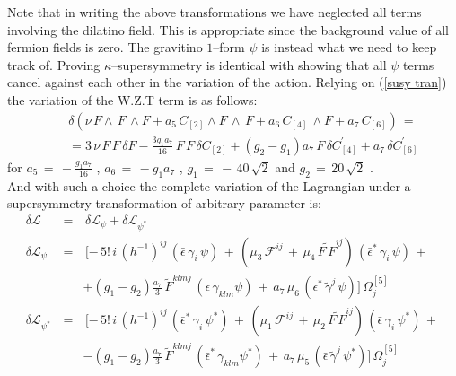 \documentclass[a4paper,11pt]{article}
\def\tilde{\widetilde}
\begin{document}
Note that in writing the above transformations we have neglected all
terms involving the dilatino field. This is appropriate since the
background value of all fermion fields is zero. The gravitino
$1$--form $\psi$ is instead what we need to keep track of. Proving
$\kappa$--supersymmetry is identical with showing that all $\psi$
terms cancel against each other in the variation of the action.
Relying on (\ref{susy tran}) the variation of the W.Z.T term is as follows:
\begin{eqnarray}
&&\delta ( \nu \, F \wedge \, F \, \wedge F +a_5 \, C_{[2]} \wedge F \, \wedge \, F + a_{6} \, C_{[4]} \, \wedge F + a_{7} \, C_{[6]}) \, = \nonumber\\
&&= 3 \, \nu \, F \, F \, \delta F - \frac{3 g_{1} a_{7}}{16}  \, F \, F \, \delta C_{[2]} + (g_{2} - g_{1}) a_{7} \, F \, \delta C_{[4]}^{\prime} + a_{7} \, \delta C_{[6]}^{\prime}
\label{var wzt}
\end{eqnarray}
for $a_5 \, = \, - \frac{g_1 a_7}{16}$ , $a_6 \, = \, - g_1 a_7$ , $g_1 \, = \, - \, 40 \, \sqrt{2}$ and $g_2 \, = \, 20 \, \sqrt{2}$ .\\
And with such a choice the complete variation of the Lagrangian under a supersymmetry  transformation of arbitrary parameter is:
\begin{eqnarray}
\delta \mathcal{L} \, & = & \, \delta \mathcal{L}_{\psi} +  \delta \mathcal{L}_{\psi^{*}} \nonumber\\
\delta \mathcal{L}_{\psi} \, & = & \, [- \, 5! \, i \, (h^{-1})^{ij} \, ({\bar\epsilon} \, \gamma_{i} \, \psi ) \, + \,
(\mu_{3} \, \mathcal{F}^{ij} \, + \, \mu_{4} \, {\tilde{F \, F}}^{ij}) \, ({\bar\epsilon}^{*} \, \gamma_{i} \, \psi ) \, + \, \nonumber\\
&& + (g_1 - g_2) \frac{a_7}{3} \, \tilde{F}^{klmj} \, (\bar{\epsilon} \, \gamma_{klm} \psi) \, + \, a_7 \, \mu_6 \, ( {\bar\epsilon}^{*} \, \tilde{\gamma}^{j} \, \psi )] \, \Omega^{[5]}_{j} \nonumber\\
\delta \mathcal{L}_{\psi^{*}} \, & = & \, [- \, 5! \, i \, (h^{-1})^{ij} \, ({\bar\epsilon}^{*} \, \gamma_{i} \, \psi^{*}) \, + \,
(\mu_{1} \, \mathcal{F}^{ij} \, + \, \mu_{2} \, {\tilde{F \, F}}^{ij}) \, ({\bar\epsilon} \, \gamma_{i} \, \psi^{*}) \, + \, \nonumber\\
&& - (g_1 - g_2) \frac{a_7}{3} \, \tilde{F}^{klmj} \, (\bar{\epsilon}^{*} \, \gamma_{klm} \psi^{*}) \, + \, a_7 \, \mu_5 \, ({\bar\epsilon} \, \tilde{\gamma}^{j} \, \psi^{*} )] \, \Omega^{[5]}_{j}
\label{delta L}
\end{eqnarray}
\end{document}
